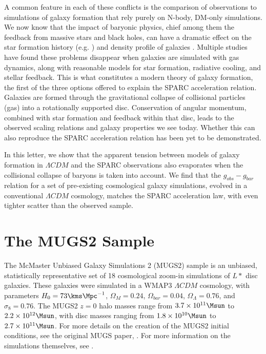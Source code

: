 A common feature in each of these conflicts is the comparison of observations to
simulations of galaxy formation that rely purely on N-body, DM-only simulations.
We now know that the impact of baryonic physics, chief among them the feedback
from massive stars and black holes, can have a dramatic effect on the star
formation history (e.g. \citealt{Keller2015}) and density profile of galaxies
\citep{Mashchenko2006}.  Multiple studies \citep[etc]{Pontzen2012,Sawala2016}
have found these problems disappear when galaxies are simulated with gas
dynamics, along with reasonable models for star formation, radiative cooling,
and stellar feedback.  This is what constitutes a modern theory of galaxy
formation, the first of the three options offered to explain the SPARC
acceleration relation.  Galaxies are formed through the gravitational collapse
of collisional particles (gas) into a rotationally supported disc.  Conservation
of angular momentum, combined with star formation and feedback within that disc,
leads to the observed scaling relations and galaxy properties we see today.
Whether this can also reproduce the SPARC acceleration relation has been yet to
be demonstrated.

In this letter, we show that the apparent tension between models of galaxy
formation in $\Lambda CDM$ and the SPARC observations also evaporates when the
collisional collapse of baryons is taken into account.  We find that the
$g_{obs}-g_{bar}$ relation for a set of pre-existing cosmological galaxy
simulations, evolved in a conventional $\Lambda CDM$ cosmology, matches the
SPARC acceleration law, with even tighter scatter than the observed sample.

\section{The MUGS2 Sample}
The McMaster Unbiased Galaxy Simulations 2 (MUGS2) sample is an unbiased,
statistically representative set of 18 cosmological zoom-in simulations of $L*$
disc galaxies.  These galaxies were simulated in a {\sc WMAP3} $\Lambda CDM$
cosmology, with parameters $H_0 = 73\kms \Mpc^{-1}$, $\Omega_M=0.24$,
$\Omega_{bar}=0.04$, $\Omega_\Lambda=0.76$, and $\sigma_8=0.76$.  The MUGS2
$z=0$ halo masses range from $3.7\times10^{11}\Msun$ to $2.2\times10^{12}\Msun$,
with disc masses ranging from $1.8\times10^{10}\Msun$ to
$2.7\times10^{11}\Msun$.  For more details on the creation of the MUGS2 initial
conditions, see the original MUGS paper, \citet{Stinson2010}.  For more
information on the simulations themselves, see \citet{Keller2015,Keller2016a}.

